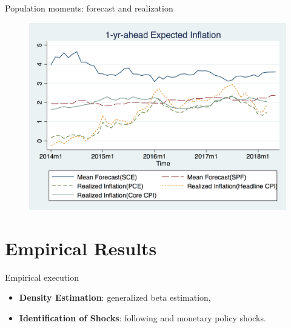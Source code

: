 \documentclass{beamer}
\begin{document}
\begin{frame}{Population moments: forecast and realization}
\begin{figure}
	\includegraphics[scale=0.3]{figures/mean_true.png} 
\end{figure}
\end{frame}

\section{Empirical Results}


\begin{frame}{Empirical execution}

\begin{itemize}

\item \textbf{Density Estimation}: generalized beta estimation, \cite{engelberg2009comparing}
 \item \textbf{Identification of Shocks}: following \cite{coibion2012can} and monetary policy shocks. 
\end{itemize}

\end{frame}
\end{document}
